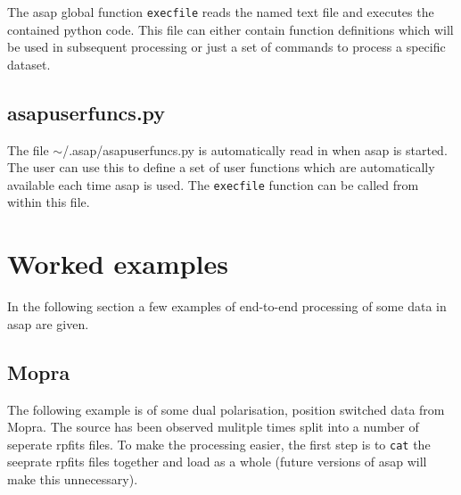 \documentclass[11pt]{article}
\newcommand{\cmd}[1]{{\tt #1}}
\begin{document}
The asap global function \cmd{execfile} reads the named text file and
executes the contained python code. This file can either contain
function definitions which will be used in subsequent processing or
just a set of commands to process a specific dataset.

\subsection{asapuserfuncs.py}

The file $\sim$/.asap/asapuserfuncs.py is automatically read in when
asap is started. The user can use this to define a set of user
functions which are automatically available each time asap is
used. The \cmd{execfile} function can be called from within this file.

\section{Worked examples}

In the following section a few examples of end-to-end processing of
some data in asap are given.

\subsection{Mopra}

The following example is of some dual polarisation, position switched
data from Mopra. The source has been observed mulitple times split
into a number of seperate rpfits files. To make the processing easier,
the first step is to \cmd{cat} the seeprate rpfits files together and
load as a whole (future versions of asap will make this unnecessary).
\end{document}

